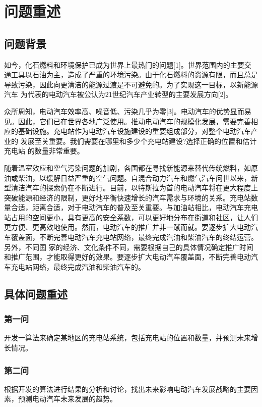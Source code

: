 \documentclass[12pt, a4paper, oneside]{ctexart}
\begin{document}
\begin{abstract}

\end{abstract}
\newpage
\section{问题重述}
\subsection{问题背景}
如今，化石燃料和环境保护已成为世界上最热⻔的问题[1]。世界范围内的主要交 通工具以石油为主，造成了严重的环境污染。由于化石燃料的资源有限，而且总是导致污染，因此向更清洁的能源过渡是不可避免的。为了实现这一目标，以新能源汽⻋ 为代表的电动汽⻋被公认为21世纪汽⻋产业转型的主要发展方向[2]。

众所周知，电动汽⻋效率高、噪音低、污染几乎为零[3]。电动汽⻋的优势显而易 ⻅。因此，它们已在世界各地广泛使用。推动电动汽⻋的规模化发展，需要完善相应的基础设施。充电站作为电动汽⻋设施建设的重要组成部分，对整个电动汽⻋产业的 发展至关重要。我们需要在哪里和多少个充电站建设?选择正确的位置和估计充电站 的数量非常重要。

随着温室效应和空气污染问题的加剧，各国都在寻找新能源来替代传统燃料，如原油或柴油，以缓解日益严重的空气问题。自混合动力汽⻋和燃气汽⻋问世以来，新型清洁汽⻋的探索仍在不断进行。目前，以特斯拉为首的电动汽⻋将在更大程度上突破能源和经济的限制，更好地平衡快速增⻓的汽⻋需求与环境的关系。充电站数量合适，距离合适，对于电动汽⻋的普及至关重要。与加油站相比，电动汽⻋充电站占用的空间更小，具有更高的安全系数，可以更好地分布在街道和社区，让人们更方便、更高效地使用。然而，电动汽⻋的推广并非一蹴而就。要逐步扩大电动汽⻋覆盖面，不断完善电动汽⻋充电站网络，最终完成汽油和柴油汽⻋的终结运营。另外，不同国 家的经济、文化条件不同，需要根据自己的具体情况确定推广时间和推广范围，才能取得更好的效果。要逐步扩大电动汽⻋覆盖面，不断完善电动汽⻋充电站网络，最终完成汽油和柴油汽⻋的。
\subsection{具体问题重述}
\subsubsection{第一问}
开发一算法来确定某地区的充电站系统，包括充电站的位置和数量，并预测未来增长情况。

\subsubsection{第二问}
根据开发的算法进行结果的分析和讨论，找出未来影响电动汽车发展战略的主要因素，预测电动汽车未来发展的趋势。
\end{document}
